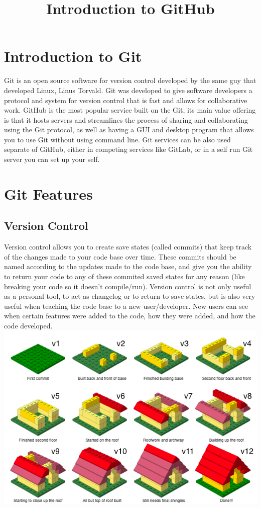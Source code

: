 \documentclass{article}
\author{}
\date{}
\title{\vspace{-4cm}Introduction to GitHub}
\begin{document}
\maketitle
\section{Introduction to Git}
Git is an open source software for version control developed by the same guy that developed Linux, Linus Torvald. Git was developed to give software developers a protocol and system for version control that is fast and allows for collaborative work. GitHub is the most popular service built on the Git, its main value offering is that it hosts servers and streamlines the process of sharing and collaborating using the Git protocol, as well as having a GUI and desktop program that allows you to use Git without using command line. Git services can be also used separate of GitHub, either in competing services like GitLab, or in a self run Git server you can set up your self.
\section{Git Features}
\subsection{Version Control}
Version control allows you to create save states (called commits) that keep track of the changes made to your code base over time. These commits should be named according to the updates made to the code base, and give you the ability to return your code to any of these commited saved states for any reason (like breaking your code so it doesn't compile/run). Version control is not only useful as a personal tool, to act as changelog or to return to save states, but is also very useful when teaching the code base to a new user/developer. New users can see when certain features were added to the code, how they were added, and how the code developed.
\includegraphics[width=\textwidth]{lego-steps-commit-messages.png}
\end{document}
